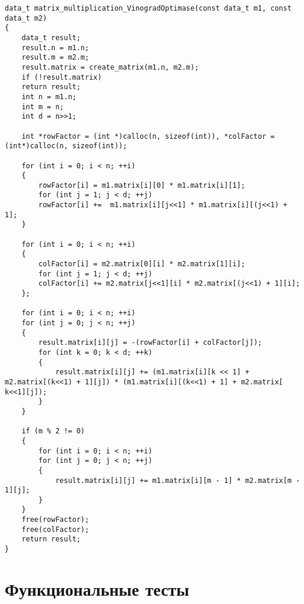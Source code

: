\newpage
\begin{center}
\begin{lstlisting}[label=vino_o,caption = {Оптимизированный алгоритм Винограда умножения матриц}]
data_t matrix_multiplication_VinogradOptimase(const data_t m1, const data_t m2)
{
	data_t result;
	result.n = m1.n;
	result.m = m2.m;
	result.matrix = create_matrix(m1.n, m2.m);
	if (!result.matrix)
	return result;
	int n = m1.n;
	int m = n;
	int d = n>>1;
	
	int *rowFactor = (int *)calloc(n, sizeof(int)), *colFactor = (int*)calloc(n, sizeof(int));
	
	for (int i = 0; i < n; ++i)
	{
		rowFactor[i] = m1.matrix[i][0] * m1.matrix[i][1];
		for (int j = 1; j < d; ++j)
		rowFactor[i] +=  m1.matrix[i][j<<1] * m1.matrix[i][(j<<1) + 1];
	}
	
	for (int i = 0; i < n; ++i)
	{
		colFactor[i] = m2.matrix[0][i] * m2.matrix[1][i];
		for (int j = 1; j < d; ++j)
		colFactor[i] += m2.matrix[j<<1][i] * m2.matrix[(j<<1) + 1][i];
	};
	
	for (int i = 0; i < n; ++i)
	for (int j = 0; j < n; ++j)
	{
		result.matrix[i][j] = -(rowFactor[i] + colFactor[j]);
		for (int k = 0; k < d; ++k)
		{
			result.matrix[i][j] += (m1.matrix[i][k << 1] + m2.matrix[(k<<1) + 1][j]) * (m1.matrix[i][(k<<1) + 1] + m2.matrix[ k<<1][j]);
		}
	}
	
	if (m % 2 != 0)
	{
		for (int i = 0; i < n; ++i)
		for (int j = 0; j < n; ++j)
		{
			result.matrix[i][j] += m1.matrix[i][m - 1] * m2.matrix[m - 1][j];
		}
	}
	free(rowFactor);
	free(colFactor);
	return result;
}
\end{lstlisting}

\end{center}
\newpage
\section{Функциональные тесты}

